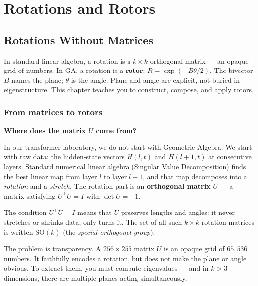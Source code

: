 \documentclass[11pt, twoside, openright]{memoir}
\numberwithin{equation}{chapter}
\begin{document}
\part{Rotations and Rotors}
\label{part:rotors}


\chapter{Rotations Without Matrices}
\label{chap:rotors}

\begin{whycare}
In standard linear algebra, a rotation is a $k \times k$ orthogonal
matrix --- an opaque grid of numbers.  In GA, a rotation is a
\textbf{rotor}: $R = \exp(-B\theta/2)$.  The bivector $B$ names the
plane; $\theta$ is the angle.  Plane and angle are explicit, not buried
in eigenstructure.  This chapter teaches you to construct, compose, and
apply rotors.
\end{whycare}

\section{From matrices to rotors}

\begin{mathbox}
\textbf{Where does the matrix $U$ come from?}

In our transformer laboratory, we do not start with Geometric Algebra.
We start with raw data: the hidden-state vectors $H(l,t)$ and
$H(l+1,t)$ at consecutive layers.  Standard numerical linear algebra
(Singular Value Decomposition) finds the best linear map from layer
$l$ to layer $l+1$, and that map decomposes into a \emph{rotation}
and a \emph{stretch}.  The rotation part is an \textbf{orthogonal
matrix} $U$ --- a matrix satisfying $U^\top U = I$ with
$\det U = +1$.

The condition $U^\top U = I$ means that $U$ preserves lengths and
angles: it never stretches or shrinks data, only turns it.  The set
of all such $k \times k$ rotation matrices is written
$\mathrm{SO}(k)$ (the \emph{special orthogonal group}).

The problem is transparency.  A $256 \times 256$ matrix $U$ is an
opaque grid of $65{,}536$ numbers.  It faithfully encodes a rotation,
but does not make the plane or angle obvious.  To extract them, you
must compute eigenvalues --- and in $k > 3$ dimensions, there are
multiple planes acting simultaneously.
\end{mathbox}
\end{document}
